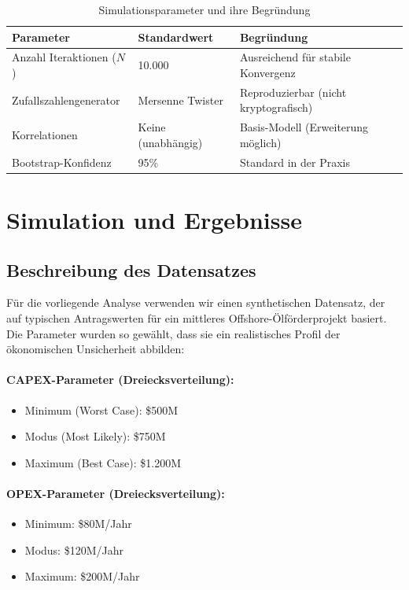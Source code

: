\documentclass[12pt,a4paper]{article}
\begin{document}
\begin{table}[H]
\centering
\begin{tabular}{lll}
\toprule
\textbf{Parameter} & \textbf{Standardwert} & \textbf{Begründung} \\
\midrule
Anzahl Iteraktionen ($N$) & 10.000 & Ausreichend für stabile Konvergenz \\
Zufallszahlengenerator & Mersenne Twister & Reproduzierbar (nicht kryptografisch) \\
Korrelationen & Keine (unabhängig) & Basis-Modell (Erweiterung möglich) \\
Bootstrap-Konfidenz & 95\% & Standard in der Praxis \\
\bottomrule
\end{tabular}
\caption{Simulationsparameter und ihre Begründung}
\end{table}

\section{Simulation und Ergebnisse}

\subsection{Beschreibung des Datensatzes}

Für die vorliegende Analyse verwenden wir einen synthetischen Datensatz, der auf typischen Antragswerten für ein mittleres Offshore-Ölförderprojekt basiert. Die Parameter wurden so gewählt, dass sie ein realistisches Profil der ökonomischen Unsicherheit abbilden:

\paragraph{CAPEX-Parameter (Dreiecksverteilung):}
\begin{itemize}[itemsep=1pt]
  \item Minimum (Worst Case): \$500M
  \item Modus (Most Likely): \$750M
  \item Maximum (Best Case): \$1.200M
\end{itemize}

\paragraph{OPEX-Parameter (Dreiecksverteilung):}
\begin{itemize}[itemsep=1pt]
  \item Minimum: \$80M/Jahr
  \item Modus: \$120M/Jahr
  \item Maximum: \$200M/Jahr
\end{itemize}
\end{document}
